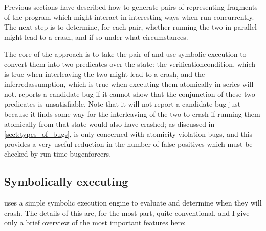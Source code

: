 Previous sections have described how to generate pairs of
{\StateMachines} representing fragments of the program which might
interact in interesting ways when run concurrently.  The next step is
to determine, for each pair, whether running the two {\StateMachines}
in parallel might lead to a crash, and if so under what circumstances.

The core of the approach is to take the pair of {\StateMachines} and
use symbolic execution\cite{King1976} to convert them into two
predicates over the {\StateMachine} state: the
\gls{verificationcondition}, which is true when interleaving the two
    {\StateMachines} might lead to a crash, and the
    \gls{inferredassumption}, which is true when executing them
    atomically in series will not.  {\Technique} reports a candidate
    bug if it cannot show that the conjunction of these two predicates
    is unsatisfiable.  Note that it will not report a candidate bug
    just because it finds some way for the interleaving of the two
    {\StateMachines} to crash if running them atomically from that
    state would also have crashed; as discussed in
    \autoref{sect:types_of_bugs}, {\technique} is only concerned with
    atomicity violation bugs, and this provides a very useful
    reduction in the number of false positives which must be checked
    by run-time \glspl{bugenforcer}.

\subsection{Symbolically executing {\StateMachines}}
\label{sect:derive:symbolic_execute}

{\Implementation} uses a simple symbolic execution engine to evaluate
{\StateMachines} and determine when they will crash.  The details of
this are, for the most part, quite conventional, and I give only a
brief overview of the most important features here:

